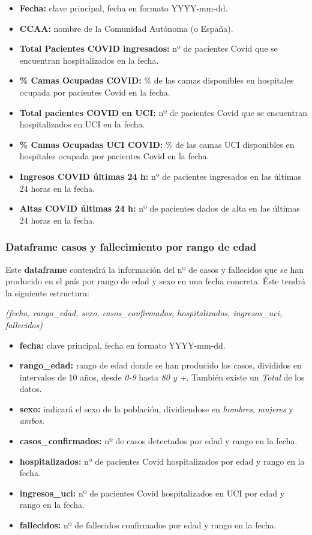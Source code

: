 \begin{itemize}
	\item \textbf{Fecha:} clave principal, fecha en formato YYYY-mm-dd.
	\item \textbf{CCAA:} nombre de la Comunidad Autónoma (o España).
	\item \textbf{Total Pacientes COVID ingresados:} nº de pacientes Covid que se encuentran hospitalizados en la fecha.
	\item \textbf{\% Camas Ocupadas COVID:} \% de las camas disponibles en hospitales ocupada por pacientes Covid en la fecha.
	\item \textbf{Total pacientes COVID en UCI:} nº de pacientes Covid que se encuentran hospitalizados en UCI en la fecha.
	\item \textbf{\% Camas Ocupadas UCI COVID:} \% de las camas UCI disponibles en hospitales ocupada por pacientes Covid en la fecha.
	\item \textbf{Ingresos COVID últimas 24 h:} nº de pacientes ingresados en las últimas 24 horas en la fecha.
	\item \textbf{Altas COVID últimas 24 h:} nº de pacientes dados de alta en las últimas 24 horas en la fecha.
\end{itemize}

\subsubsection{Dataframe casos y fallecimiento por rango de edad}

Este \textbf{dataframe} contendrá la información del nº de casos y fallecidos que se han producido en el país por rango de edad y sexo en una fecha concreta. Éste tendrá la siguiente estructura:

\begin{center}
	\textit{(fecha, rango\_edad, sexo, casos\_confirmados, hospitalizados, ingresos\_uci, fallecidos)}
\end{center}

\begin{itemize}
	\item \textbf{fecha:} clave principal, fecha en formato YYYY-mm-dd.
	\item \textbf{rango\_edad:} rango de edad donde se han producido los casos, divididos en intervalos de 10 años, desde \textit{0-9} hasta \textit{80 y +}. También existe un \textit{Total} de los datos.
	\item \textbf{sexo:} indicará el sexo de la población, dividiendose en \textit{hombres}, \textit{mujeres} y \textit{ambos}.
	\item \textbf{casos\_confirmados:} nº de casos detectados por edad y rango en la fecha.
	\item \textbf{hospitalizados:} nº de pacientes Covid hospitalizados por edad y rango en la fecha.
	\item \textbf{ingresos\_uci:} nº de pacientes Covid hospitalizados en UCI por edad y rango en la fecha.
	\item \textbf{fallecidos:} nº de fallecidos confirmados por edad y rango en la fecha.
\end{itemize}

